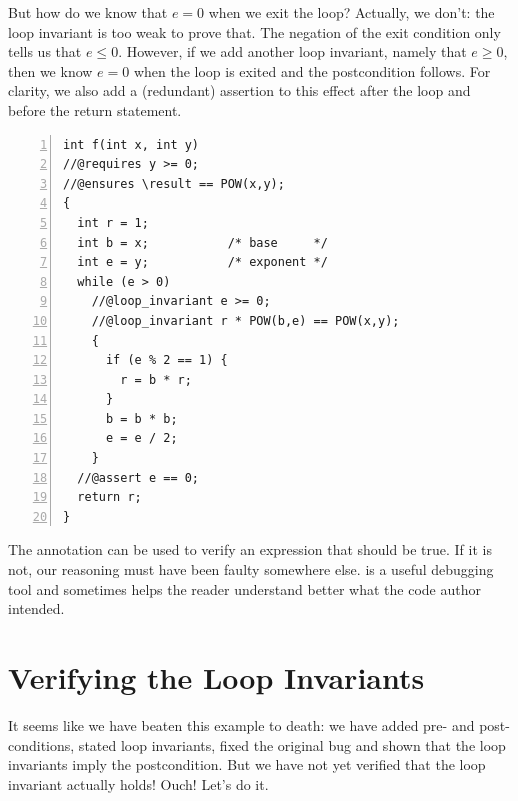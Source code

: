 But how do we know that $e = 0$ when we exit the loop?  Actually,
we don't: the loop invariant is too weak to prove that.  The negation
of the exit condition only tells us that $e \leq 0$.  However, if
we add another loop invariant, namely that $e \geq 0$, then
we know $e = 0$ when the loop is exited and the postcondition
follows.  For clarity, we also add a (redundant) assertion to this
effect after the loop and before the return statement.

\begin{lstlisting}[language={[C0]C}, numbers=left]
int f(int x, int y)
//@requires y >= 0;
//@ensures \result == POW(x,y);
{
  int r = 1;
  int b = x;           /* base     */
  int e = y;           /* exponent */
  while (e > 0)
    //@loop_invariant e >= 0;
    //@loop_invariant r * POW(b,e) == POW(x,y);
    {
      if (e % 2 == 1) {
        r = b * r;
      }
      b = b * b;
      e = e / 2;
    }
  //@assert e == 0;
  return r;
}
\end{lstlisting}

The \assert{} annotation can be used to verify an expression that
should be true.  If it is not, our reasoning must have been faulty
somewhere else. \assert{} is a useful debugging tool and
sometimes helps the reader understand better what the code author
intended.


\clearpage
\section{Verifying the Loop Invariants}
\label{sec:contracts:proving_loop_invariant}

It seems like we have beaten this example to death: we have added pre-
and post-conditions, stated loop invariants, fixed the original bug
and shown that the loop invariants imply the postcondition.  But we
have not yet verified that the loop invariant actually holds!  Ouch!
Let's do it.

